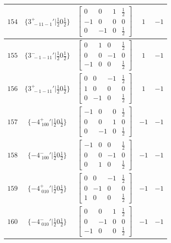 \documentclass[fleqn,8pt]{jsarticle}
\begin{document}
\begin{longtable}{ccccc}
$ 154 $ & $ \{3^{+}_{\,\,-11-1}{}'|\frac{1}{2} 0 \frac{1}{2}\} $ & $ \begin{bmatrix} 0 & 0 & 1 & \frac{1}{2} \\ -1 & 0 & 0 & 0 \\ 0 & -1 & 0 & \frac{1}{2} \end{bmatrix} $ & $ 1 $ & $ -1 $ \\ \hline
$ 155 $ & $ \{3^{-}_{\,\,-1-11}{}'|\frac{1}{2} 0 \frac{1}{2}\} $ & $ \begin{bmatrix} 0 & 1 & 0 & \frac{1}{2} \\ 0 & 0 & -1 & 0 \\ -1 & 0 & 0 & \frac{1}{2} \end{bmatrix} $ & $ 1 $ & $ -1 $ \\ \hline
$ 156 $ & $ \{3^{+}_{\,\,-1-11}{}'|\frac{1}{2} 0 \frac{1}{2}\} $ & $ \begin{bmatrix} 0 & 0 & -1 & \frac{1}{2} \\ 1 & 0 & 0 & 0 \\ 0 & -1 & 0 & \frac{1}{2} \end{bmatrix} $ & $ 1 $ & $ -1 $ \\ \hline
$ 157 $ & $ \{-4^{+}_{\,\,100}{}'|\frac{1}{2} 0 \frac{1}{2}\} $ & $ \begin{bmatrix} -1 & 0 & 0 & \frac{1}{2} \\ 0 & 0 & 1 & 0 \\ 0 & -1 & 0 & \frac{1}{2} \end{bmatrix} $ & $ -1 $ & $ -1 $ \\ \hline
$ 158 $ & $ \{-4^{-}_{\,\,100}{}'|\frac{1}{2} 0 \frac{1}{2}\} $ & $ \begin{bmatrix} -1 & 0 & 0 & \frac{1}{2} \\ 0 & 0 & -1 & 0 \\ 0 & 1 & 0 & \frac{1}{2} \end{bmatrix} $ & $ -1 $ & $ -1 $ \\ \hline
$ 159 $ & $ \{-4^{+}_{\,\,010}{}'|\frac{1}{2} 0 \frac{1}{2}\} $ & $ \begin{bmatrix} 0 & 0 & -1 & \frac{1}{2} \\ 0 & -1 & 0 & 0 \\ 1 & 0 & 0 & \frac{1}{2} \end{bmatrix} $ & $ -1 $ & $ -1 $ \\ \hline
$ 160 $ & $ \{-4^{-}_{\,\,010}{}'|\frac{1}{2} 0 \frac{1}{2}\} $ & $ \begin{bmatrix} 0 & 0 & 1 & \frac{1}{2} \\ 0 & -1 & 0 & 0 \\ -1 & 0 & 0 & \frac{1}{2} \end{bmatrix} $ & $ -1 $ & $ -1 $ \\ \hline

\end{longtable}
\end{document}
